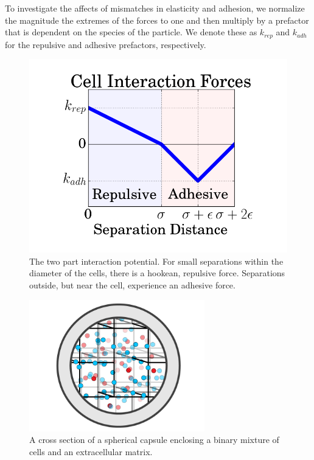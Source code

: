 \documentclass[aps,prb,twocolumn,groupedaddress,nofootinbib,floatfix]{revtex4}
\begin{document}
To investigate the affects of mismatches in elasticity and adhesion, we normalize the magnitude the extremes of the forces to one and then multiply by a prefactor that is dependent on the species of the particle. We denote these as $k_{rep}$ and $k_{adh}$ for the repulsive and adhesive prefactors, respectively.

\begin{figure}
  \includegraphics[width=1.0\columnwidth]{interaction.png}
  \caption[capsuleECM]{The two part interaction potential. For small separations
    within the diameter of the cells, there is a hookean, repulsive force. Separations
    outside, but near the cell, experience an adhesive force.}
   \label{fig:interaction}
\end{figure}



\begin{figure}
  \includegraphics[width=3in]{Fig2.png}
  \caption[capsuleECM]
   {A cross section of a spherical capsule enclosing a binary mixture of 
   cells and an extracellular matrix.}
   \label{fig:capsuleECM}
\end{figure}
\end{document}
